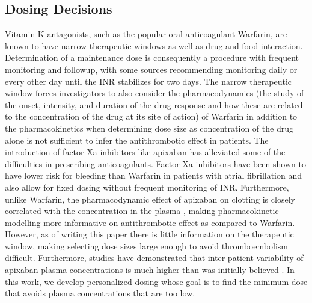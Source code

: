 \subsection*{Dosing Decisions}

Vitamin K antagonists, such as the popular oral anticoagulant Warfarin, are known to have narrow therapeutic windows as well as drug and food interaction. Determination of a maintenance dose is consequently a procedure with frequent monitoring and followup, with some sources recommending monitoring daily or every other day until the INR stabilizes for two days.  The narrow therapeutic window forces investigators to also consider the pharmacodynamics (the study of the onset, intensity, and duration of the drug response and how these are related to the concentration of the drug at its site of action) of Warfarin in addition to the pharmacokinetics when determining dose size as concentration of the drug alone is not sufficient to infer the antithrombotic effect in patients. The introduction of factor Xa inhibitors like apixaban has alleviated some of the difficulties in prescribing anticoagulants.  Factor Xa inhibitors have been shown to have lower risk for bleeding than Warfarin in patients with atrial fibrillation \citep{vinogradova2018risks} and also allow for fixed dosing without frequent monitoring of INR. Furthermore, unlike Warfarin, the pharmacodynamic effect of apixaban on clotting is closely correlated with the concentration in the plasma \citep{Byon2019-gf}, making pharmacokinetic modelling more informative on antithrombotic effect as compared to Warfarin.  However, as of writing this paper there is little information on the therapeutic window, making selecting dose sizes large enough to avoid thromboembolism difficult. Furthermore, studies have demonstrated that inter-patient variability of apixaban plasma concentrations is much higher than was initially believed \citep{gulilat2020drug}. In this work, we develop personalized dosing whose goal is to find the minimum dose that avoids plasma concentrations that are too low. 

